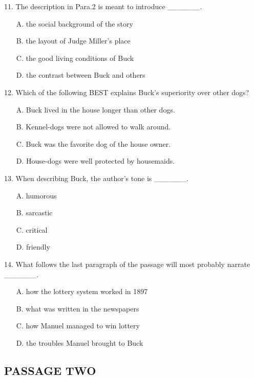 \documentclass[UTF8,11pt]{ctexart}
\begin{document}
11. The description in Para.2 is meant to introduce \_\_\_\_\_\_.


\begin{itemize}[leftmargin=2em,itemsep=.2em,topsep=.4em]\item[A.] the social background of the story
\item[B.] the layout of Judge Miller’s place
\item[C.] the good living conditions of Buck
\item[D.] the contrast between Buck and others
\end{itemize}

12. Which of the following BEST explains Buck’s superiority over other dogs?


\begin{itemize}[leftmargin=2em,itemsep=.2em,topsep=.4em]\item[A.] Buck lived in the house longer than other dogs.
\item[B.] Kennel-dogs were not allowed to walk around.
\item[C.] Buck was the favorite dog of the house owner.
\item[D.] House-dogs were well protected by housemaids.
\end{itemize}

13. When describing Buck, the author’s tone is \_\_\_\_\_\_.


\begin{itemize}[leftmargin=2em,itemsep=.2em,topsep=.4em]\item[A.] humorous
\item[B.] sarcastic
\item[C.] critical
\item[D.] friendly
\end{itemize}

14. What follows the last paragraph of the passage will most probably narrate \_\_\_\_\_\_.


\begin{itemize}[leftmargin=2em,itemsep=.2em,topsep=.4em]\item[A.] how the lottery system worked in 1897
\item[B.] what was written in the newspapers
\item[C.] how Manuel managed to win lottery
\item[D.] the troubles Manuel brought to Buck
\end{itemize}

\subsection*{\textbf{PASSAGE TWO}}
\end{document}
